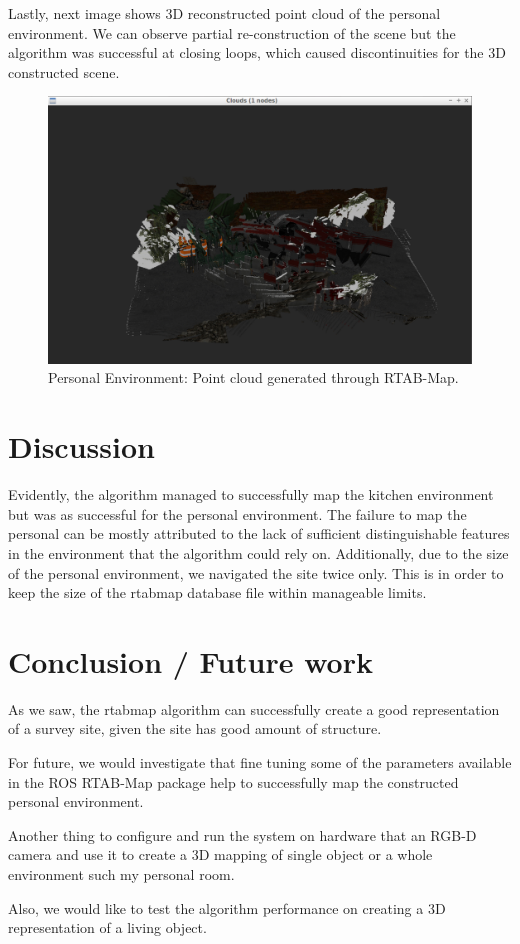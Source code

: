 \documentclass[10pt,journal,compsoc]{IEEEtran}
\begin{document}
Lastly, next image shows 3D reconstructed point cloud of the personal environment. We can observe partial re-construction of the scene but the algorithm was successful at closing loops, which caused discontinuities for the 3D constructed scene.

\begin{figure}[thpb]
      \centering
      \includegraphics[width=\linewidth]{personal-point-cloud.png}
      \caption{Personal Environment: Point cloud generated through RTAB-Map.}
      \label{fig:network-training}
\end{figure}


\section{Discussion}

Evidently, the algorithm managed to successfully map the kitchen environment but was as successful for the personal environment. The failure to map the personal can be mostly attributed to the lack of sufficient distinguishable features in the environment that the algorithm could rely on. Additionally, due to the size of the personal environment, we navigated the site twice only. This is in order to keep the size of the rtabmap database file within manageable limits.

\section{Conclusion / Future work}

As we saw, the rtabmap algorithm can successfully create a good representation of a survey site, given the site has good amount of structure.

For future, we would investigate that fine tuning some of the parameters available in the ROS RTAB-Map package help to successfully map the constructed personal environment.

Another thing to configure and run the system on hardware that an RGB-D camera and use it to create a 3D mapping of single object or a whole environment such my personal room.

Also, we would like to test the algorithm performance on creating a 3D representation of a living object.



\end{document}
